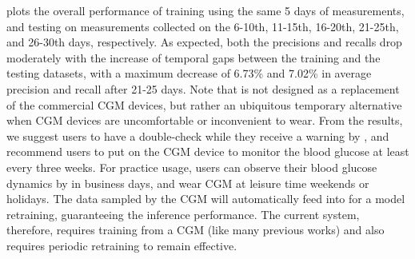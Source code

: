  plots the overall performance of training using the same 5 days of measurements, and testing on measurements collected on the 6-10th, 11-15th, 16-20th, 21-25th, and 26-30th days, respectively.
As expected, both the precisions and recalls drop moderately with the increase of temporal gaps between the training and the testing datasets, with a maximum decrease of 6.73\% and 7.02\% in average precision and recall after 21-25 days.
\textcolor[rgb]{1.00,0.00,0.00}{Note that \sysname is not designed as a replacement of the commercial CGM devices, but rather an ubiquitous temporary alternative when CGM devices are uncomfortable or inconvenient to wear. From the results, we suggest users to have a double-check while they receive a warning by \sysname, and recommend users to put on the CGM device to monitor the blood glucose at least every three weeks. For practice usage, users can observe their blood glucose dynamics by \sysname in business days, and wear CGM at leisure time \eg weekends or holidays. The data sampled by the CGM will automatically feed into \sysname for a model retraining, guaranteeing the inference performance. The current system, therefore, requires training from a CGM (like many previous works) and also requires periodic retraining to remain effective.}




%
%

